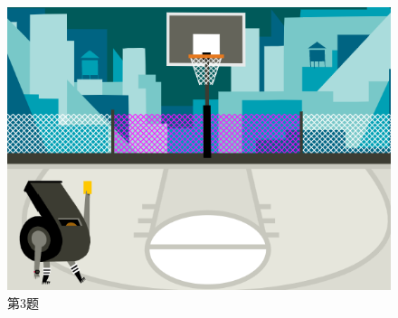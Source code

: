 \documentclass[10pt, a4paper]{article}
\begin{document}
\begin{enumerate}
\begin{figure}[htbp]
\begin{minipage}[t]{.35\textwidth}
\begin{minipage}[t]{.48\textwidth}
                \end{minipage}
                \begin{minipage}[t]{.48\textwidth}
                    \centering
                    \includegraphics[width=\textwidth]{3-2.png}
                \end{minipage}
                \caption*{第3题}
            \end{minipage}
            \begin{minipage}[t]{.06\textwidth}
                \centering

\end{minipage}
\end{figure}
\end{enumerate}
\end{document}
